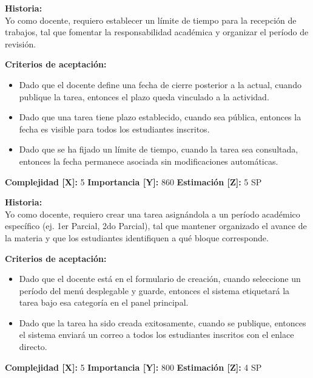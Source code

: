 \documentclass[12pt,a4paper]{article}
\begin{document}
\vspace{0.5em}

\begin{tcolorbox}[title=\textbf{HU-02: Gestionar el cronograma de evaluación}]
\textbf{Historia:} \\
Yo como docente, requiero establecer un límite de tiempo para la recepción de trabajos, tal que fomentar la responsabilidad académica y organizar el período de revisión.

\vspace{0.5em}
\textbf{Criterios de aceptación:}
\begin{itemize}
    \item Dado que el docente define una fecha de cierre posterior a la actual, cuando publique la tarea, entonces el plazo queda vinculado a la actividad.
    \item Dado que una tarea tiene plazo establecido, cuando sea pública, entonces la fecha es visible para todos los estudiantes inscritos.
    \item Dado que se ha fijado un límite de tiempo, cuando la tarea sea consultada, entonces la fecha permanece asociada sin modificaciones automáticas.
\end{itemize}
\textbf{Complejidad [X]:} 5 \hfill \textbf{Importancia [Y]:} 860 \hfill \textbf{Estimación [Z]:} 5 SP
\end{tcolorbox}

\vspace{0.5em}

\begin{tcolorbox}[title=\textbf{HU-03: Crear asignación clasificada por período académico}]
\textbf{Historia:} \\
Yo como docente, requiero crear una tarea asignándola a un período académico específico (ej. 1er Parcial, 2do Parcial), tal que mantener organizado el avance de la materia y que los estudiantes identifiquen a qué bloque corresponde.

\vspace{0.5em}
\textbf{Criterios de aceptación:}
\begin{itemize}
    \item Dado que el docente está en el formulario de creación, cuando seleccione un período del menú desplegable y guarde, entonces el sistema etiquetará la tarea bajo esa categoría en el panel principal.
    \item Dado que la tarea ha sido creada exitosamente, cuando se publique, entonces el sistema enviará un correo a todos los estudiantes inscritos con el enlace directo.
\end{itemize}
\textbf{Complejidad [X]:} 5 \hfill \textbf{Importancia [Y]:} 800 \hfill \textbf{Estimación [Z]:} 4 SP
\end{tcolorbox}
\end{document}
